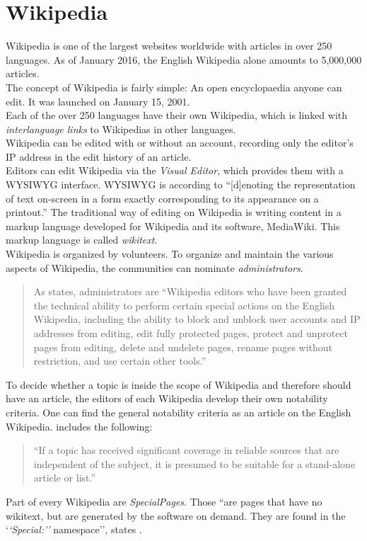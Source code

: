 \section{Wikipedia}
Wikipedia is one of the largest websites worldwide with articles in over 250 languages. As of January 2016, the English Wikipedia alone amounts to 5,000,000 articles. \citep{wiki:32} \\
The concept of Wikipedia is fairly simple: An open encyclopaedia anyone can edit. It was launched on January 15, 2001. \citep{wiki:31} \\
Each of the over 250 languages have their own Wikipedia, which is linked with \textit{interlanguage links} to Wikipedias in other languages. \\
Wikipedia can be edited with or without an account, recording only the editor's IP address in the edit history of an article. \\
Editors can edit Wikipedia via the \textit{Visual Editor}, which provides them with a WYSIWYG interface. WYSIWYG is according to \citet{wysiwyg} ``[d]enoting the representation of text on-screen in a form exactly corresponding to its appearance on a printout.'' The traditional way of editing on Wikipedia is writing content in a markup language developed for Wikipedia and its software, MediaWiki. This markup language is called \textit{wikitext}. \\
Wikipedia is organized by volunteers. To organize and maintain the various aspects of Wikipedia, the communities can nominate \textit{administrators}.
\begin{quote}
 As \citet{wiki:10} states, administrators are ``Wikipedia editors who have been granted the technical ability to perform certain special actions on the English Wikipedia, including the ability to block and unblock user accounts and IP addresses from editing, edit fully protected pages, protect and unprotect pages from editing, delete and undelete pages, rename pages without restriction, and use certain other tools.''
\end{quote}

To decide whether a topic is inside the scope of Wikipedia and therefore should have an article, the editors of each Wikipedia develop their own notability criteria. One can find the general notability criteria as an article on the English Wikipedia. \citet{wiki:11} includes the following: 
\begin{quote}
 ``If a topic has received significant coverage in reliable sources that are independent of the subject, it is presumed to be suitable for a stand-alone article or list.''
\end{quote}

Part of every Wikipedia are \textit{SpecialPages}. Those ``are pages that have no wikitext, but are generated by the software on demand. They are found in the `\textit{`Special:''} namespace'', states \citet{wiki:12}.

